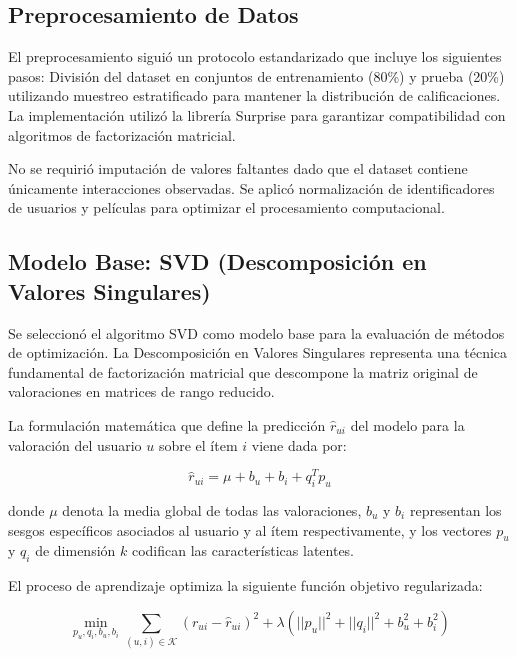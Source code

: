 \documentclass[conference]{IEEEtran}
\begin{document}
\subsection{Preprocesamiento de Datos}

El preprocesamiento siguió un protocolo estandarizado que incluye los siguientes pasos: División del dataset en conjuntos de entrenamiento (80\%) y prueba (20\%) utilizando muestreo estratificado para mantener la distribución de calificaciones. La implementación utilizó la librería Surprise para garantizar compatibilidad con algoritmos de factorización matricial.

No se requirió imputación de valores faltantes dado que el dataset contiene únicamente interacciones observadas. Se aplicó normalización de identificadores de usuarios y películas para optimizar el procesamiento computacional.

\subsection{Modelo Base: SVD (Descomposición en Valores Singulares)}

Se seleccionó el algoritmo SVD como modelo base para la evaluación de métodos de optimización. La Descomposición en Valores Singulares representa una técnica fundamental de factorización matricial que descompone la matriz original de valoraciones en matrices de rango reducido.

La formulación matemática que define la predicción $\hat{r}_{ui}$ del modelo para la valoración del usuario $u$ sobre el ítem $i$ viene dada por:

\begin{equation}
\hat{r}_{ui} = \mu + b_u + b_i + q_i^T p_u
\end{equation}

donde $\mu$ denota la media global de todas las valoraciones, $b_u$ y $b_i$ representan los sesgos específicos asociados al usuario y al ítem respectivamente, y los vectores $p_u$ y $q_i$ de dimensión $k$ codifican las características latentes.

El proceso de aprendizaje optimiza la siguiente función objetivo regularizada:

\begin{equation}
\min_{p_u, q_i, b_u, b_i} \sum_{(u,i) \in \mathcal{K}} \left( r_{ui} - \hat{r}_{ui} \right)^2 + \lambda \left( ||p_u||^2 + ||q_i||^2 + b_u^2 + b_i^2 \right)
\end{equation}
\end{document}
